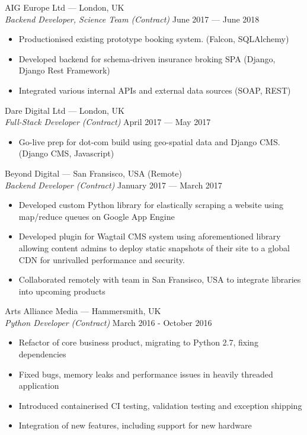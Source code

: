 \documentclass[margin, 10pt]{res}
\begin{document}
\begin{resume}
AIG Europe Ltd --- London, UK \\
{\sl Backend Developer, Science Team (Contract)} \hfill June 2017 --- June 2018 \\
\begin{itemize} \itemsep -1pt
\item Productionised existing prototype booking system. (Falcon, SQLAlchemy)
\item Developed backend for schema-driven insurance broking SPA (Django, Django Rest Framework)
\item Integrated various internal APIs and external data sources (SOAP, REST)
\end{itemize}

Dare Digital Ltd --- London, UK \\
{\sl Full-Stack Developer (Contract)} \hfill April 2017 --- May 2017 \\
\begin{itemize} \itemsep -1pt
\item Go-live prep for dot-com build using geo-spatial data and Django CMS. (Django CMS, Javascript)
\end{itemize}

Beyond Digital --- San Fransisco, USA (Remote) \\
{\sl Backend Developer (Contract)} \hfill January 2017 --- March 2017 \\

\begin{itemize} \itemsep -1pt
\item Developed custom Python library for elastically scraping a website using map/reduce queues on Google App Engine
\item Developed plugin for Wagtail CMS system using aforementioned library allowing content admins to deploy static snapshots of their site to a global CDN for unrivalled performance and security.
\item Collaborated remotely with team in San Fransisco, USA to integrate libraries into upcoming products
\end{itemize}

Arts Alliance Media --- Hammersmith, UK \\
{\sl Python Developer (Contract)} \hfill March 2016 - October 2016 \\

\begin{itemize} \itemsep -1pt
\item Refactor of core business product, migrating to Python 2.7, fixing dependencies
\item Fixed bugs, memory leaks and performance issues in heavily threaded application
\item Introduced containerised CI testing, validation testing and exception shipping
\item Integration of new features, including support for new hardware
\end{itemize}


\end{resume}
\end{document}
